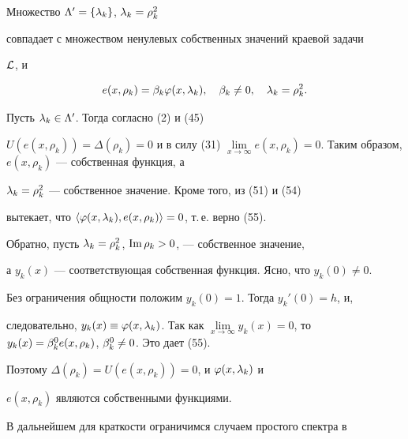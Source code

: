 \begin{thm}


Множество $\Lambda'=\{\lambda_k\}$, $\lambda_k=\rho_k^2$


совпадает с множеством ненулевых собственных значений краевой задачи


${\cal L}$, и


\begin{equation}


e(x,\rho_k)=\be_k \vv(x,\la_k),


\quad \beta_k \ne 0,\quad \la_k=\rho_k^2.


\end{equation}


\end{thm}





\begin{pf}


Пусть $\lambda_k\in\Lambda'$. Тогда согласно (2) и (45)


$U(e(x,\rho_k))=\Delta(\rho_k)=0$ и в силу (31) $\lim\limits_{x\to\infty}


e(x,\rho_k)=0$. Таким образом, $e(x,\rho_k)$ --- собственная функция, а


$\lambda_k=\rho_k^2$ --- собственное значение. Кроме того, из (51) и (54)


вытекает, что $\langle\varphi(x,\lambda_k),e(x,\rho_k)\rangle=0$, т.\,е. верно (55).





Обратно, пусть $\lambda_k=\rho_k^2$, $\operatorname{Im}\rho_k>0$, --- собственное значение,


а $y_k(x)$ --- соответствующая собственная функция. Ясно, что $y_k(0)\ne 0$.


Без ограничения общности положим $y_k(0)=1$. Тогда $y_k'(0)=h$, и,


следовательно, $y_k(x)\equiv\vv(x,\la_k)$. Так как $\lim\limits_{x\to\infty}


y_k(x)=0$, то $y_k(x)=\be_k^0 e(x,\rho_k)$, $\be_k^0\ne 0$. Это дает (55).


Поэтому $\Delta(\rho_k)=U(e(x,\rho_k))=0$, и $\varphi(x,\lambda_k)$ и


$e(x,\rho_k)$ являются собственными функциями.


\end{pf}





В дальнейшем для краткости ограничимся случаем простого спектра в


